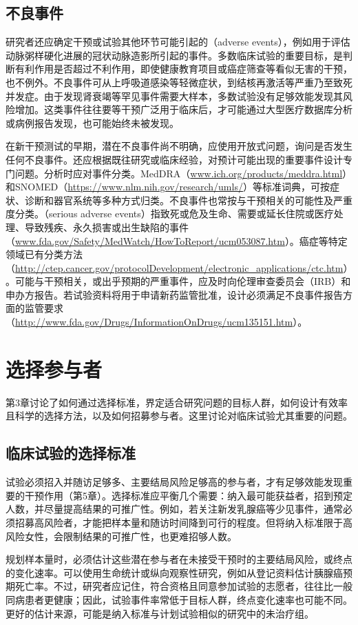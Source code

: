 \subsection{不良事件}
研究者还应确定干预或试验其他环节可能引起的（adverse events），例如用于评估动脉粥样硬化进展的冠状动脉造影所引起的事件。多数临床试验的重要目标，是判断有利作用是否超过不利作用，即使健康教育项目或癌症筛查等看似无害的干预，也不例外。不良事件可从上呼吸道感染等轻微症状，到结核再激活等严重乃至致死并发症。由于发现肾衰竭等罕见事件需要大样本，多数试验没有足够效能发现其风险增加。这类事件往往要等干预广泛用于临床后，才可能通过大型医疗数据库分析或病例报告发现，也可能始终未被发现。

在新干预测试的早期，潜在不良事件尚不明确，应使用开放式问题，询问是否发生任何不良事件。还应根据既往研究或临床经验，对预计可能出现的重要事件设计专门问题。分析时应对事件分类。MedDRA（\url{www.ich.org/products/meddra.html}）和SNOMED（\url{https://www.nlm.nih.gov/research/umls/}）等标准词典，可按症状、诊断和器官系统等多种方式归类。不良事件也常按与干预相关的可能性及严重度分类。（serious adverse events）指致死或危及生命、需要或延长住院或医疗处理、导致残疾、永久损害或出生缺陷的事件（\url{www.fda.gov/Safety/MedWatch/HowToReport/ucm053087.htm}）。癌症等特定领域已有分类方法（\url{http://ctep.cancer.gov/protocolDevelopment/electronic_applications/ctc.htm}）。可能与干预相关，或出乎预期的严重事件，应及时向伦理审查委员会（IRB）和申办方报告。若试验资料将用于申请新药监管批准，设计必须满足不良事件报告方面的监管要求（\url{http://www.fda.gov/Drugs/InformationOnDrugs/ucm135151.htm}）。

\section{选择参与者}
第3章讨论了如何通过选择标准，界定适合研究问题的目标人群，如何设计有效率且科学的选择方法，以及如何招募参与者。这里讨论对临床试验尤其重要的问题。
\subsection{临床试验的选择标准}
试验必须招入并随访足够多、主要结局风险足够高的参与者，才有足够效能发现重要的干预作用（第5章）。选择标准应平衡几个需要：纳入最可能获益者，招到预定人数，并尽量提高结果的可推广性。例如，若关注新发乳腺癌等少见事件，通常必须招募高风险者，才能把样本量和随访时间降到可行的程度。但将纳入标准限于高风险女性，会限制结果的可推广性，也更难招够人数。

规划样本量时，必须估计这些潜在参与者在未接受干预时的主要结局风险，或终点的变化速率。可以使用生命统计或纵向观察性研究，例如从登记资料估计胰腺癌预期死亡率。不过，研究者应记住，符合资格且同意参加试验的志愿者，往往比一般同病患者更健康；因此，试验事件率常低于目标人群，终点变化速率也可能不同。更好的估计来源，可能是纳入标准与计划试验相似的研究中的未治疗组。

